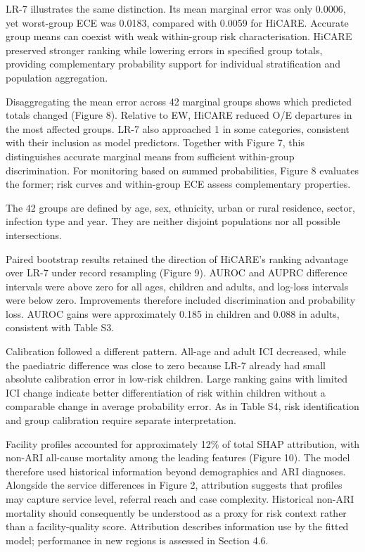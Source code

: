 \documentclass[11pt,a4paper]{article}
\newcommand{\subheading}[1]{\par\needspace{3\baselineskip}\vspace{5pt}{\bfseries #1}\par\vspace{1pt}}
\begin{document}
LR-7 illustrates the same distinction. Its mean marginal error was only 0.0006, yet worst-group ECE was 0.0183, compared with 0.0059 for HiCARE. Accurate group means can coexist with weak within-group risk characterisation. HiCARE preserved stronger ranking while lowering errors in specified group totals, providing complementary probability support for individual stratification and population aggregation.

\subheading{Figure 8. Observed-to-expected mortality in 42 specified marginal subgroups in cross-validation.}
Disaggregating the mean error across 42 marginal groups shows which predicted totals changed (Figure 8). Relative to EW, HiCARE reduced O/E departures in the most affected groups. LR-7 also approached 1 in some categories, consistent with their inclusion as model predictors. Together with Figure 7, this distinguishes accurate marginal means from sufficient within-group discrimination. For monitoring based on summed probabilities, Figure 8 evaluates the former; risk curves and within-group ECE assess complementary properties.

{\small The 42 groups are defined by age, sex, ethnicity, urban or rural residence, sector, infection type and year. They are neither disjoint populations nor all possible intersections.\par}
\subheading{Figure 9. Paired bootstrap differences between HiCARE and the reference model in cross-validation.}
Paired bootstrap results retained the direction of HiCARE’s ranking advantage over LR-7 under record resampling (Figure 9). AUROC and AUPRC difference intervals were above zero for all ages, children and adults, and log-loss intervals were below zero. Improvements therefore included discrimination and probability loss. AUROC gains were approximately 0.185 in children and 0.088 in adults, consistent with Table S3.

Calibration followed a different pattern. All-age and adult ICI decreased, while the paediatric difference was close to zero because LR-7 already had small absolute calibration error in low-risk children. Large ranking gains with limited ICI change indicate better differentiation of risk within children without a comparable change in average probability error. As in Table S4, risk identification and group calibration require separate interpretation.

\subheading{Figure 10. TreeSHAP attribution. (A) Leading features. (B) Attribution shares by feature group. (C) Historical facility non-ARI mortality and attribution.}
Facility profiles accounted for approximately 12\% of total SHAP attribution, with non-ARI all-cause mortality among the leading features (Figure 10). The model therefore used historical information beyond demographics and ARI diagnoses. Alongside the service differences in Figure 2, attribution suggests that profiles may capture service level, referral reach and case complexity. Historical non-ARI mortality should consequently be understood as a proxy for risk context rather than a facility-quality score. Attribution describes information use by the fitted model; performance in new regions is assessed in Section 4.6.
\end{document}
